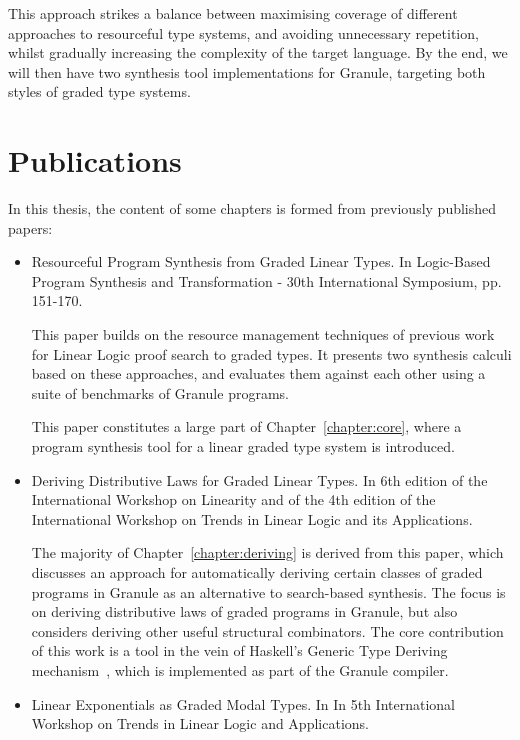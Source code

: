 This approach strikes a balance between maximising coverage of different
approaches to resourceful type systems, and avoiding unnecessary repetition,
whilst gradually increasing the complexity of the target language. By the end, we
will then have two synthesis tool implementations for Granule, targeting both
styles of graded type systems.

\section{Publications}
In this thesis, the content of some chapters is formed from
previously published papers:
\begin{itemize}
    \item \citet{DBLP:conf/lopstr/HughesO20} Resourceful Program Synthesis from
    Graded Linear Types. In Logic-Based Program Synthesis and Transformation -
    30th International Symposium, pp. 151-170. 
    
    This paper builds on the resource management techniques of previous work for
    Linear Logic proof search to graded types. It presents two synthesis
    calculi based on these approaches, and evaluates them against each other 
    using a suite of benchmarks of Granule programs. 
    
    This paper constitutes a large part of Chapter~\ref{chapter:core}, where a
    program synthesis tool for a linear graded type system is introduced. 

    \item \citet{DBLP:journals/corr/abs-2112-14966} Deriving Distributive Laws
    for Graded Linear Types. In 6th edition of the International Workshop on
    Linearity and of the 4th edition of the International Workshop on Trends in
    Linear Logic and its Applications. 

    The majority of Chapter~\ref{chapter:deriving} is derived from this paper,
    which discusses an approach for automatically deriving certain classes of
    graded programs in Granule as an alternative to search-based synthesis. The
    focus is on deriving distributive laws of graded programs in Granule, but
    also considers deriving other useful structural combinators. The core
    contribution of this work is a tool in the vein of Haskell's Generic Type
    Deriving mechanism~\citep{generic-deriving}, which is implemented as part of
    the Granule compiler.

    \item \citet{hughes:lirmm-03271465} Linear Exponentials as Graded Modal
    Types. In In 5th International Workshop on Trends in Linear Logic and
    Applications.  


\end{itemize}
